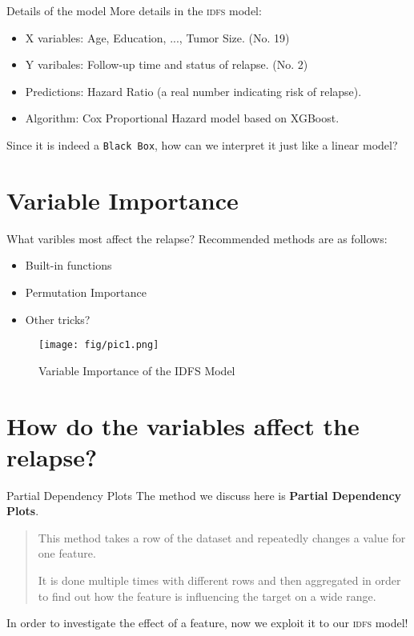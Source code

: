 \documentclass[10pt]{beamer}
\begin{document}
\begin{frame}[fragile]{Details of the model}
  More details in the \textsc{idfs} model:
  \begin{itemize}
    \item X variables: Age, Education, ..., Tumor Size. (No. 19)
    \item Y varibales: Follow-up time and status of relapse. (No. 2)
    \item Predictions: Hazard Ratio (a real number indicating risk of relapse).
    \item Algorithm: Cox Proportional Hazard model based on XGBoost.
  \end{itemize}

  Since it is indeed a \texttt{Black Box}, how can we interpret it just like a linear model?

\end{frame}

\section{Variable Importance}

\begin{frame}{What varibles most affect the relapse?}
  Recommended methods are as follows:
  \begin{itemize}
    \item Built-in functions
    \item Permutation Importance
    \item Other tricks?
  \end{itemize}
	
	\begin{figure}[htbp]

    \centering
    \texttt{[image: fig/pic1.png]}
    \caption{Variable Importance of the \textsc{IDFS} Model}

  \end{figure}
\end{frame}

\section{How do the variables affect the relapse?}

\begin{frame}[fragile]{Partial Dependency Plots}
  The method we discuss here is \textbf{Partial Dependency Plots}.

  \begin{quote}
    This method takes a row of the dataset and repeatedly changes a value for one feature.

    It is done multiple times with different rows and then aggregated in order to find out how the feature is influencing the target on a wide range.
  \end{quote}
  
  In order to investigate the effect of a feature, now we exploit it to our \textsc{idfs} model!
\end{frame}
\end{document}
